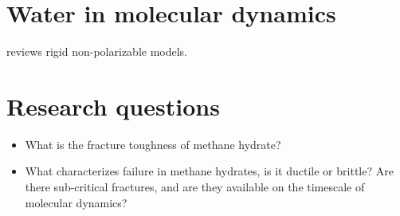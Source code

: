 \section{Water in molecular dynamics}
\cite{Vega2011} reviews rigid non-polarizable models.

\section{Research questions}
\begin{itemize}
\item What is the fracture toughness of methane hydrate?
\item What characterizes failure in methane hydrates, is it ductile or brittle? Are there sub-critical fractures, and are they available on the timescale of molecular dynamics?
\end{itemize}
